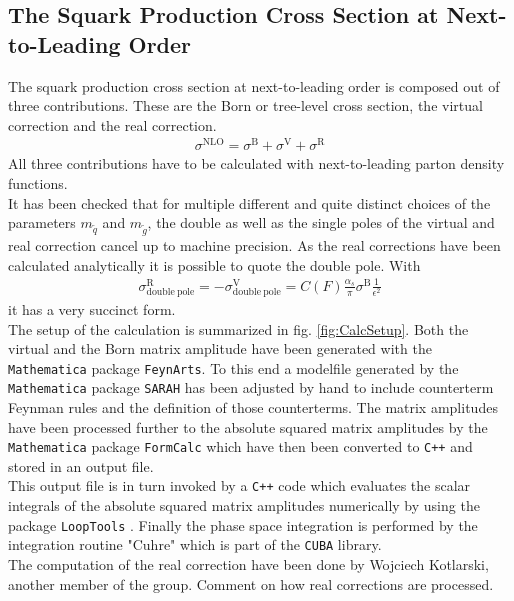 \subsection{The Squark Production Cross Section at Next-to-Leading Order}
The squark production cross section at next-to-leading order is composed out of three contributions. These are the Born or tree-level cross section, the virtual correction and the real correction. 
\begin{align}
\sigma^{\mathrm{NLO}} = \sigma^{\mathrm{B}} + \sigma^{\mathrm{V}} + \sigma^{\mathrm{R}}\label{eq:BVR}
\end{align}
All three contributions have to be calculated with next-to-leading parton density functions.\\
It has been checked that for multiple different and quite distinct choices of the parameters $m_{\tilde{q}}$ and $m_{\tilde{g}}$, the double as well as the single poles of the virtual and real correction cancel up to machine precision. As the real corrections have been calculated analytically it is possible to quote the double pole. With
\begin{align}
\sigma^{\mathrm{R}}_{\mathrm{double\ pole}} = -\sigma^{\mathrm{V}}_{\mathrm{double\ pole}} = C(F)\frac{\alpha_s}{\pi}\sigma^{\mathrm{B}} \frac{1}{\epsilon^2}
\end{align}
it has a very succinct form. \\
The setup of the calculation is summarized in fig. \ref{fig:CalcSetup}. Both the virtual and the Born matrix amplitude have been generated with the \texttt{Mathematica} package \texttt{FeynArts}. To this end a modelfile generated by the \texttt{Mathematica} package \texttt{SARAH} has been adjusted by hand to include counterterm Feynman rules and the definition of those counterterms. The matrix amplitudes have been processed further to the absolute squared matrix amplitudes by the \texttt{Mathematica} package \texttt{FormCalc} which have then been converted to \texttt{C++} and stored in an output file.\\
This output file is in turn invoked by a \texttt{C++} code which evaluates the scalar integrals of the absolute squared matrix amplitudes numerically by using the package \texttt{LoopTools} \cite{Hahn:1998}. Finally the phase space integration is performed by the integration routine "Cuhre" which is part of the \texttt{CUBA} library\cite{Hahn:2004fe}.\\
The computation of the real correction have been done by Wojciech Kotlarski, another member of the group. Comment on how real corrections are processed.\\
